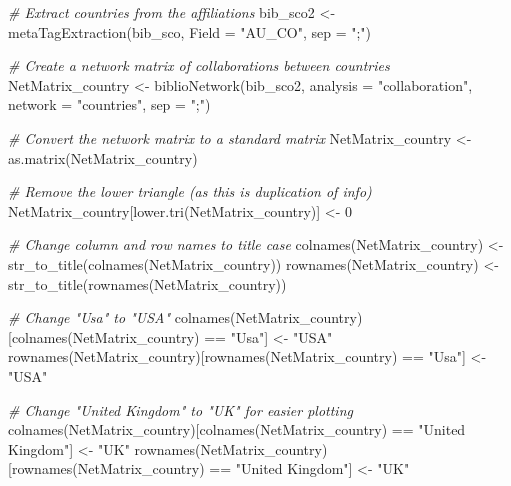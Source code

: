 \documentclass[
]{article}
\newenvironment{Shaded}{\begin{snugshade}}{\end{snugshade}}
\newcommand{\AttributeTok}[1]{\textcolor[rgb]{0.77,0.63,0.00}{#1}}
\newcommand{\CommentTok}[1]{\textcolor[rgb]{0.56,0.35,0.01}{\textit{#1}}}
\newcommand{\DecValTok}[1]{\textcolor[rgb]{0.00,0.00,0.81}{#1}}
\newcommand{\FunctionTok}[1]{\textcolor[rgb]{0.00,0.00,0.00}{#1}}
\newcommand{\NormalTok}[1]{#1}
\newcommand{\OtherTok}[1]{\textcolor[rgb]{0.56,0.35,0.01}{#1}}
\newcommand{\SpecialCharTok}[1]{\textcolor[rgb]{0.00,0.00,0.00}{#1}}
\newcommand{\StringTok}[1]{\textcolor[rgb]{0.31,0.60,0.02}{#1}}
\begin{document}
\begin{Shaded}
\begin{Highlighting}[]
\CommentTok{\# Extract countries from the affiliations}
\NormalTok{bib\_sco2 }\OtherTok{\textless{}{-}} \FunctionTok{metaTagExtraction}\NormalTok{(bib\_sco, }\AttributeTok{Field =} \StringTok{"AU\_CO"}\NormalTok{, }\AttributeTok{sep =} \StringTok{";"}\NormalTok{)}

\CommentTok{\# Create a network matrix of collaborations between countries}
\NormalTok{NetMatrix\_country }\OtherTok{\textless{}{-}} \FunctionTok{biblioNetwork}\NormalTok{(bib\_sco2, }\AttributeTok{analysis =} \StringTok{"collaboration"}\NormalTok{, }\AttributeTok{network =} \StringTok{"countries"}\NormalTok{, }\AttributeTok{sep =} \StringTok{";"}\NormalTok{)}

\CommentTok{\# Convert the network matrix to a standard matrix}
\NormalTok{NetMatrix\_country }\OtherTok{\textless{}{-}} \FunctionTok{as.matrix}\NormalTok{(NetMatrix\_country)}

\CommentTok{\# Remove the lower triangle (as this is duplication of info)}
\NormalTok{NetMatrix\_country[}\FunctionTok{lower.tri}\NormalTok{(NetMatrix\_country)] }\OtherTok{\textless{}{-}} \DecValTok{0} 

\CommentTok{\# Change column and row names to title case}
\FunctionTok{colnames}\NormalTok{(NetMatrix\_country) }\OtherTok{\textless{}{-}} \FunctionTok{str\_to\_title}\NormalTok{(}\FunctionTok{colnames}\NormalTok{(NetMatrix\_country))}
\FunctionTok{rownames}\NormalTok{(NetMatrix\_country) }\OtherTok{\textless{}{-}} \FunctionTok{str\_to\_title}\NormalTok{(}\FunctionTok{rownames}\NormalTok{(NetMatrix\_country))}

\CommentTok{\# Change "Usa" to "USA"}
\FunctionTok{colnames}\NormalTok{(NetMatrix\_country)[}\FunctionTok{colnames}\NormalTok{(NetMatrix\_country) }\SpecialCharTok{==} \StringTok{"Usa"}\NormalTok{] }\OtherTok{\textless{}{-}} \StringTok{"USA"}
\FunctionTok{rownames}\NormalTok{(NetMatrix\_country)[}\FunctionTok{rownames}\NormalTok{(NetMatrix\_country) }\SpecialCharTok{==} \StringTok{"Usa"}\NormalTok{] }\OtherTok{\textless{}{-}} \StringTok{"USA"}

\CommentTok{\# Change "United Kingdom" to "UK" for easier plotting}
\FunctionTok{colnames}\NormalTok{(NetMatrix\_country)[}\FunctionTok{colnames}\NormalTok{(NetMatrix\_country) }\SpecialCharTok{==} \StringTok{"United Kingdom"}\NormalTok{] }\OtherTok{\textless{}{-}} \StringTok{"UK"}
\FunctionTok{rownames}\NormalTok{(NetMatrix\_country)[}\FunctionTok{rownames}\NormalTok{(NetMatrix\_country) }\SpecialCharTok{==} \StringTok{"United Kingdom"}\NormalTok{] }\OtherTok{\textless{}{-}} \StringTok{"UK"}


\end{Highlighting}
\end{Shaded}
\end{document}
